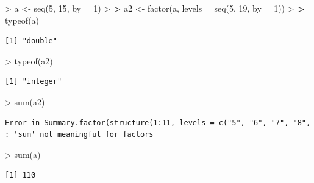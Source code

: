 \documentclass[
]{book}
\newenvironment{Shaded}{\begin{snugshade}}{\end{snugshade}}
\newcommand{\AttributeTok}[1]{\textcolor[rgb]{0.77,0.63,0.00}{#1}}
\newcommand{\DecValTok}[1]{\textcolor[rgb]{0.00,0.00,0.81}{#1}}
\newcommand{\ErrorTok}[1]{\textcolor[rgb]{0.64,0.00,0.00}{\textbf{#1}}}
\newcommand{\FunctionTok}[1]{\textcolor[rgb]{0.00,0.00,0.00}{#1}}
\newcommand{\NormalTok}[1]{#1}
\newcommand{\OtherTok}[1]{\textcolor[rgb]{0.56,0.35,0.01}{#1}}
\newcommand{\SpecialCharTok}[1]{\textcolor[rgb]{0.00,0.00,0.00}{#1}}
\theoremstyle{definition}
\theoremstyle{definition}
\theoremstyle{definition}
\theoremstyle{definition}
\theoremstyle{remark}
\begin{document}
\begin{Shaded}
\begin{Highlighting}[]
\SpecialCharTok{\textgreater{}}\NormalTok{ a }\OtherTok{\textless{}{-}} \FunctionTok{seq}\NormalTok{(}\DecValTok{5}\NormalTok{, }\DecValTok{15}\NormalTok{, }\AttributeTok{by =} \DecValTok{1}\NormalTok{)}
\SpecialCharTok{\textgreater{}} 
\ErrorTok{\textgreater{}}\NormalTok{ a2 }\OtherTok{\textless{}{-}} \FunctionTok{factor}\NormalTok{(a, }\AttributeTok{levels =} \FunctionTok{seq}\NormalTok{(}\DecValTok{5}\NormalTok{, }\DecValTok{19}\NormalTok{, }\AttributeTok{by =} \DecValTok{1}\NormalTok{))}
\SpecialCharTok{\textgreater{}} 
\ErrorTok{\textgreater{}} \FunctionTok{typeof}\NormalTok{(a)}
\end{Highlighting}
\end{Shaded}

\begin{verbatim}
[1] "double"
\end{verbatim}

\begin{Shaded}
\begin{Highlighting}[]
\SpecialCharTok{\textgreater{}} \FunctionTok{typeof}\NormalTok{(a2)}
\end{Highlighting}
\end{Shaded}

\begin{verbatim}
[1] "integer"
\end{verbatim}

\begin{Shaded}
\begin{Highlighting}[]
\SpecialCharTok{\textgreater{}} \FunctionTok{sum}\NormalTok{(a2)}
\end{Highlighting}
\end{Shaded}

\begin{verbatim}
Error in Summary.factor(structure(1:11, levels = c("5", "6", "7", "8", : 'sum' not meaningful for factors
\end{verbatim}

\begin{Shaded}
\begin{Highlighting}[]
\SpecialCharTok{\textgreater{}} \FunctionTok{sum}\NormalTok{(a)}
\end{Highlighting}
\end{Shaded}

\begin{verbatim}
[1] 110
\end{verbatim}
\end{document}
